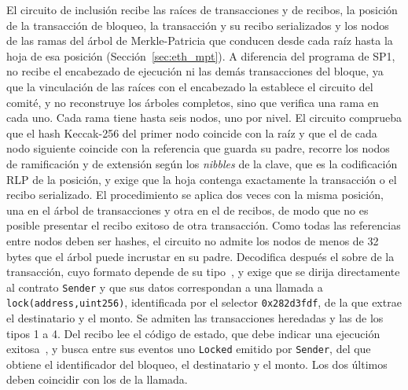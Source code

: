 El circuito de inclusión recibe las raíces de transacciones y de recibos, la posición de la
transacción de bloqueo, la transacción y su recibo serializados y los nodos de las ramas del
árbol de Merkle-Patricia que conducen desde cada raíz hasta la hoja de esa posición
(Sección~\ref{sec:eth_mpt}). A diferencia del programa de SP1, no recibe el encabezado de
ejecución ni las demás transacciones del bloque, ya que la vinculación de las raíces con el
encabezado la establece el circuito del comité, y no reconstruye los árboles completos, sino que
verifica una rama en cada uno. Cada rama tiene hasta seis nodos, uno por nivel. El circuito
comprueba que el hash Keccak-256 del primer nodo coincide con la raíz y que el de cada nodo
siguiente coincide con la referencia que guarda su padre, recorre los nodos de ramificación y de
extensión según los \textit{nibbles} de la clave, que es la codificación RLP de la posición, y
exige que la hoja contenga exactamente la transacción o el recibo serializado. El procedimiento se
aplica dos veces con la misma posición, una en el árbol de transacciones y otra en el de recibos,
de modo que no es posible presentar el recibo exitoso de otra transacción. Como todas las
referencias entre nodos deben ser hashes, el circuito no admite los nodos de menos de 32 bytes
que el árbol puede incrustar en su padre.
Decodifica después el sobre de la transacción, cuyo formato depende de su
tipo~\cite{eip2718}, y exige que se dirija directamente al contrato \texttt{Sender} y que sus datos
correspondan a una llamada a \lstinline|lock(address,uint256)|, identificada por el selector
\texttt{0x282d3fdf}, de la que extrae el destinatario y el monto. Se admiten las transacciones
heredadas y las de los tipos 1 a 4. Del recibo lee el código de estado, que debe indicar una
ejecución exitosa~\cite{eip658}, y busca entre sus eventos uno \texttt{Locked} emitido por
\texttt{Sender}, del que obtiene el identificador del bloqueo, el destinatario y el monto. Los
dos últimos deben coincidir con los de la llamada.

